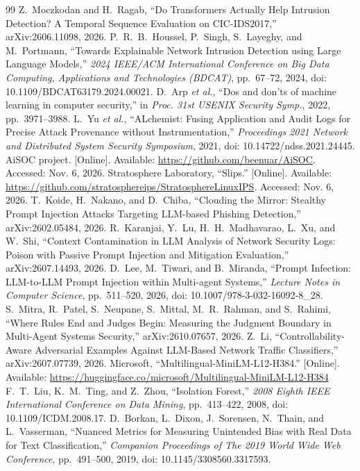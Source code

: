 \begin{thebibliography}{99}
 Z.~Moczkodan and H.~Ragab, ``Do Transformers Actually Help Intrusion Detection? A Temporal Sequence Evaluation on CIC-IDS2017,'' arXiv:2606.11098, 2026.
 P.~R.~B.~Houssel, P.~Singh, S.~Layeghy, and M.~Portmann, ``Towards Explainable Network Intrusion Detection using Large Language Models,'' \emph{2024 IEEE/ACM International Conference on Big Data Computing, Applications and Technologies (BDCAT)}, pp.~67--72, 2024, doi: 10.1109/BDCAT63179.2024.00021.
 D.~Arp \emph{et al.}, ``Dos and don'ts of machine learning in computer security,'' in \emph{Proc. 31st USENIX Security Symp.}, 2022, pp.~3971--3988.
 L.~Yu \emph{et al.}, ``ALchemist: Fusing Application and Audit Logs for Precise Attack Provenance without Instrumentation,'' \emph{Proceedings 2021 Network and Distributed System Security Symposium}, 2021, doi: 10.14722/ndss.2021.24445.
 AiSOC project. [Online]. Available: \url{https://github.com/beenuar/AiSOC}. Accessed: Nov. 6, 2026.
 Stratosphere Laboratory, ``Slips.'' [Online]. Available: \url{https://github.com/stratosphereips/StratosphereLinuxIPS}. Accessed: Nov. 6, 2026.
 T.~Koide, H.~Nakano, and D.~Chiba, ``Clouding the Mirror: Stealthy Prompt Injection Attacks Targeting LLM-based Phishing Detection,'' arXiv:2602.05484, 2026.
 R.~Karanjai, Y.~Lu, H.~H.~Madhavarao, L.~Xu, and W.~Shi, ``Context Contamination in LLM Analysis of Network Security Logs: Poison with Passive Prompt Injection and Mitigation Evaluation,'' arXiv:2607.14493, 2026.
 D.~Lee, M.~Tiwari, and B.~Miranda, ``Prompt Infection: LLM-to-LLM Prompt Injection within Multi-agent Systems,'' \emph{Lecture Notes in Computer Science}, pp.~511--520, 2026, doi: 10.1007/978-3-032-16092-8\_28.
 S.~Mitra, R.~Patel, S.~Neupane, S.~Mittal, M.~R.~Rahman, and S.~Rahimi, ``Where Rules End and Judges Begin: Measuring the Judgment Boundary in Multi-Agent Systems Security,'' arXiv:2610.07657, 2026.
 Z.~Li, ``Controllability-Aware Adversarial Examples Against LLM-Based Network Traffic Classifiers,'' arXiv:2607.07739, 2026.
 Microsoft, ``Multilingual-MiniLM-L12-H384.'' [Online]. Available: \url{https://huggingface.co/microsoft/Multilingual-MiniLM-L12-H384}
 F.~T.~Liu, K.~M.~Ting, and Z.~Zhou, ``Isolation Forest,'' \emph{2008 Eighth IEEE International Conference on Data Mining}, pp.~413--422, 2008, doi: 10.1109/ICDM.2008.17.
 D.~Borkan, L.~Dixon, J.~Sorensen, N.~Thain, and L.~Vasserman, ``Nuanced Metrics for Measuring Unintended Bias with Real Data for Text Classification,'' \emph{Companion Proceedings of The 2019 World Wide Web Conference}, pp.~491--500, 2019, doi: 10.1145/3308560.3317593.

\end{thebibliography}
